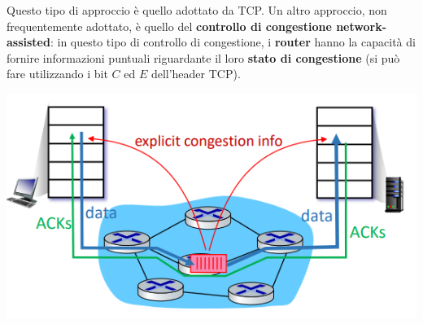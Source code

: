 \documentclass[12pt]{article}
\begin{document}
Questo tipo di approccio è quello adottato da TCP.
Un altro approccio, non frequentemente adottato, è quello del \textbf{controllo di congestione network-assisted}: in questo tipo di controllo di congestione,
i \textbf{router} hanno la capacità di fornire informazioni puntuali riguardante il loro \textbf{stato di congestione} (si può fare utilizzando i bit $C$ ed $E$ dell'header TCP).
\begin{center}
    \includegraphics[width = 0.65\linewidth]{Images/68.png}
\end{center}
\end{document}
